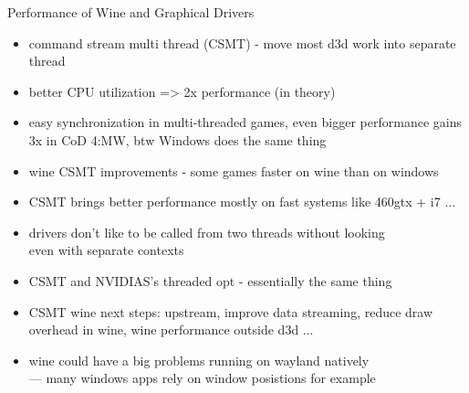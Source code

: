 \documentclass[aspectratio=169]{beamer}
\begin{document}
\begin{frame}{Performance of Wine and Graphical Drivers}
  \begin{itemize}
  \item command stream multi thread (CSMT) - move most d3d work into separate thread
  \item better CPU utilization => 2x performance (in theory)
  \item easy synchronization in multi-threaded games, even bigger performance gains
        \\3x in CoD 4:MW, btw Windows does the same thing
  \item wine CSMT improvements - some games faster on wine than on windows
  \item CSMT brings better performance mostly on fast systems like 460gtx + i7 ...
  \item drivers don't like to be called from two threads without looking
        \\even with separate contexts
  \item CSMT and NVIDIAS's threaded opt - essentially the same thing
  \item CSMT wine next steps: upstream, improve data streaming, reduce draw overhead in wine, wine performance outside d3d ...
  \item wine could have a big problems running on wayland natively
        \\--- many windows apps rely on window posistions for example
  \end{itemize}
\end{frame}  
  
\end{document}

